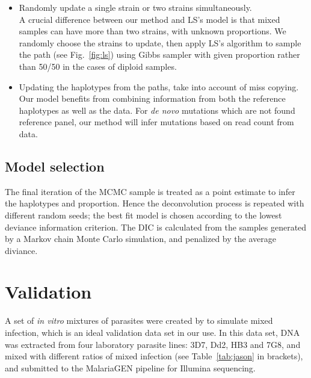 \documentclass{bioinfo}
\begin{document}
\begin{methods}
\begin{itemize}
\item Randomly update a single strain or two strains simultaneously.\\
A crucial difference between our method and LS's model is that mixed samples can have more than two strains, with unknown proportions. We randomly choose the strains to update, then apply LS's algorithm to sample the path (see Fig.~\ref{fig:ls}) using Gibbs sampler with given proportion rather than 50/50 in the cases of diploid samples.
\item Updating the haplotypes from the paths, take into account of miss copying. Our model benefits from combining information from both the reference haplotypes as well as the data. For {\em de novo} mutations which are not found reference panel, our method will infer mutations based on read count from data.


\end{itemize}


\subsection{Model selection}
The final iteration of the MCMC sample is treated as a point estimate to infer the haplotypes and proportion. %
Hence the deconvolution process is repeated with different random seeds; the best fit model is chosen according to the lowest deviance information criterion. The DIC is calculated from the samples generated by a Markov chain Monte Carlo simulation, and penalized by the average diviance.



\section{Validation}
A set of {\it in vitro} mixtures of parasites were created by \citet{Wendler2015} to simulate mixed infection, which is an ideal validation data set in our use. In this data set, DNA was extracted from four laboratory parasite lines: 3D7, Dd2, HB3 and 7G8, and mixed with different ratios of mixed infection (see Table~\ref{tab:jason} in brackets), and submitted to the MalariaGEN pipeline \citep{MalariaGen2008} for Illumina sequencing.



\end{methods}
\end{document}
